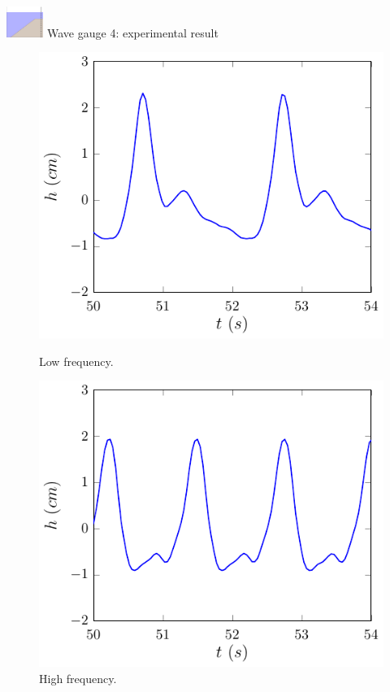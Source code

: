 \documentclass[pdf]{beamer}
\begin{document}
\begin{frame}{\includegraphics[width=1.2cm]{./Pics/WT4z.pdf} \hspace{1cm} Wave gauge 4: experimental result }
	\begin{figure}
		\centering
		\begin{minipage}{.5\textwidth}
			\centering
			\includegraphics[width=0.9\linewidth]{./Pics/SL/WG4/1e-figure0.pdf}
			\caption{Low frequency.}
		\end{minipage}%
		\begin{minipage}{.5\textwidth}
			\centering
			\includegraphics[width=0.9\linewidth]{./Pics/SH/WG4/1e-figure0.pdf}
			\caption{High frequency.}
		\end{minipage}
	\end{figure}
\end{frame}
\end{document}
